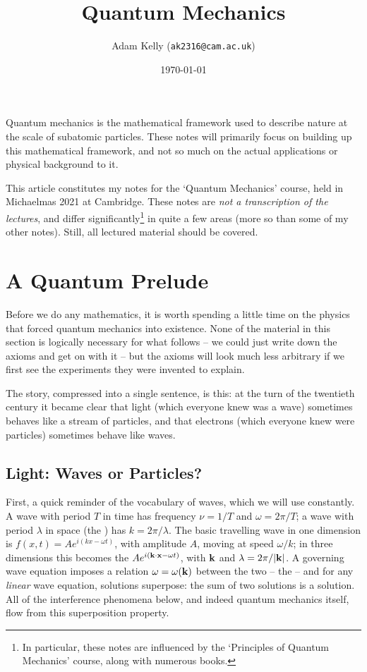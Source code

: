 \documentclass[a4paper]{scrartcl}
\title{Quantum Mechanics}
\author{Adam Kelly (\texttt{ak2316@cam.ac.uk})}
\date{\today}
\begin{document}
\maketitle


Quantum mechanics is the mathematical framework used to describe nature at the scale of subatomic particles. These notes will primarily focus on building up this mathematical framework, and not so much on the actual applications or physical background to it.

This article constitutes my notes for the `Quantum Mechanics' course, held in Michaelmas 2021 at Cambridge. These notes are \emph{not a transcription of the lectures}, and differ significantly\footnote{In particular, these notes are influenced by the `Principles of Quantum Mechanics' course, along with numerous books.} in quite a few areas (more so than some of my other notes). Still, all lectured material should be covered.

\tableofcontents

\section{A Quantum Prelude}

Before we do any mathematics, it is worth spending a little time on the physics that forced quantum mechanics into existence. None of the material in this section is logically necessary for what follows -- we could just write down the axioms and get on with it -- but the axioms will look much less arbitrary if we first see the experiments they were invented to explain.

The story, compressed into a single sentence, is this: at the turn of the twentieth century it became clear that light (which everyone knew was a wave) sometimes behaves like a stream of particles, and that electrons (which everyone knew were particles) sometimes behave like waves.

\subsection{Light: Waves or Particles?}

First, a quick reminder of the vocabulary of waves, which we will use constantly. A wave with period $T$ in time has frequency $\nu = 1/T$ and  $\omega = 2\pi/T$; a wave with period $\lambda$ in space (the ) has  $k = 2\pi/\lambda$. The basic travelling wave in one dimension is $f(x, t) = A e^{i(kx - \omega t)}$, with amplitude $A$, moving at speed $\omega / k$; in three dimensions this becomes the  $A e^{i(\mathbf{k}\cdot\mathbf{x} - \omega t)}$, with  $\mathbf{k}$ and $\lambda = 2\pi/\lvert\mathbf{k}\rvert$. A governing wave equation imposes a relation $\omega = \omega(\mathbf{k})$ between the two -- the  -- and for any \emph{linear} wave equation, solutions superpose: the sum of two solutions is a solution. All of the interference phenomena below, and indeed quantum mechanics itself, flow from this superposition property.
\end{document}
